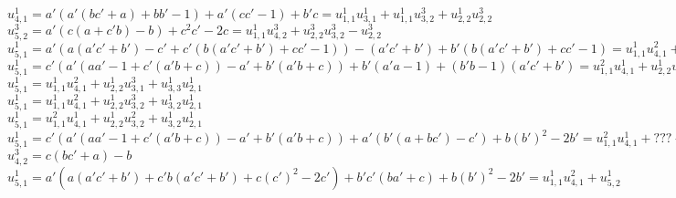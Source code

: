 \documentclass{amsart}
\numberwithin{theorem}{section}
\begin{document}
\begin{landscape}
\[    \]
    $u_{4,1}^1 = a'(a'(bc'+a)+bb'-1)+a'(cc'-1)+b'c = u_{1,1}^1 u_{3,1}^1 + u_{1,1}^1 u_{3,2}^3 + u_{2,2}^1 u_{2,2}^3$\\
    $u_{5,2}^3 = a'(c(a+c'b)-b)+c^2c'-2c = u_{1,1}^1 u_{4,2}^3 + u_{2,2}^3 u_{3,2}^3 - u_{2,2}^3$\\
    $u_{5,1}^1 = a'(a(a'c'+b')-c'+c'(b(a'c'+b')+cc'-1))-(a'c'+b')+b'(b(a'c'+b')+cc'-1) = u_{1,1}^1 u_{4,1}^2 + u_{5,2}^1$\\
    $u_{5,1}^1 = c'(a'(aa'-1+c'(a'b+c))-a'+b'(a'b+c))+b'(a'a-1)+(b'b-1)(a'c'+b') = u_{1,1}^2 u_{4,1}^1 + u_{2,2}^1 u_{3,2}^2 + u_{3,2}^1 u_{2,1}^1$\\
    $u_{5,1}^1 = u_{1,1}^1 u_{4,1}^2 + u_{2,2}^1 u_{3,1}^3 + u_{3,3}^1 u_{2,1}^1$\\
    $u_{5,1}^1 = u_{1,1}^1 u_{4,1}^2 + u_{2,2}^1 u_{3,2}^3 + u_{3,2}^1 u_{2,1}^1$\\
    $u_{5,1}^1 = u_{1,1}^2 u_{4,1}^1 + u_{2,2}^1 u_{3,2}^2 + u_{3,2}^1 u_{2,1}^1$\\
    $u_{5,1}^1 = c'(a'(aa'-1+c'(a'b+c))-a'+b'(a'b+c))+a'(b'(a+bc')-c')+b(b')^2-2b' = u_{1,1}^2 u_{4,1}^1 + ??? + \text{lower chebyshev}$\\
    $u_{4,2}^3 = c(bc'+a)-b$\\
    $u_{5,1}^1 = a'(a(a'c'+b')+c'b(a'c'+b')+c(c')^2-2c')+b'c'(ba'+c)+b(b')^2-2b' = u_{1,1}^1 u_{4,1}^2 + u_{5,2}^1$\\
  \end{landscape}
\end{document}
